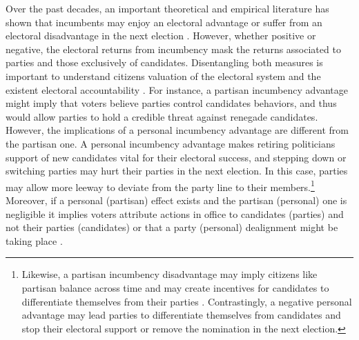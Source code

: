 \documentclass[12pt]{amsart}
\numberwithin{equation}{section}
\theoremstyle{definition}
\theoremstyle{definition}
\theoremstyle{definition}
\begin{document}
Over the past decades, an important theoretical and empirical literature has shown that incumbents may enjoy an electoral advantage \citep{ashworth_2012, cox_morgensten_1993, cox_katz_1996, ansolabehere_snyder_2000, ashworth_bdm_2008, ashworth_etal_2019} or suffer from an electoral disadvantage in the next election \citep{klasnja_2015, klasnja_titiunik_2017}. However, whether positive or negative, the electoral returns from incumbency mask the returns associated to parties and those exclusively of candidates. Disentangling both measures is important to understand citizens valuation of the electoral system and the existent electoral accountability \citep{mayhew_1974, fowler_hall_2014}. For instance, a partisan incumbency advantage might imply that voters believe parties control candidates behaviors, and thus would allow parties to hold a credible threat against renegade candidates. %
However, the implications of a personal incumbency advantage are different from the partisan one. A personal incumbency advantage makes retiring politicians support of new candidates vital for their electoral success, and stepping down or switching parties may hurt their parties in the next election. In this case, parties may allow more leeway to deviate from the party line to their members.\footnote{Likewise, a partisan incumbency disadvantage may imply citizens like partisan balance across time and may create incentives for candidates to differentiate themselves from their parties \citep{klasnja_titiunik_2017}. Contrastingly, a negative personal advantage may lead parties to differentiate themselves from candidates and stop their electoral support or remove the nomination in the next election.} Moreover, if a personal (partisan) effect exists and the partisan (personal) one is negligible it implies voters attribute actions in office to candidates (parties) and not their parties (candidates) or that a party (personal) dealignment might be taking place \citep{cox_katz_1996}.   
   
\end{document}
